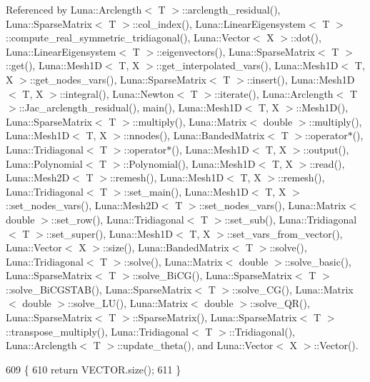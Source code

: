 Referenced by Luna\+::\+Arclength$<$ T $>$\+::arclength\+\_\+residual(), Luna\+::\+Sparse\+Matrix$<$ T $>$\+::col\+\_\+index(), Luna\+::\+Linear\+Eigensystem$<$ T $>$\+::compute\+\_\+real\+\_\+symmetric\+\_\+tridiagonal(), Luna\+::\+Vector$<$ X $>$\+::dot(), Luna\+::\+Linear\+Eigensystem$<$ T $>$\+::eigenvectors(), Luna\+::\+Sparse\+Matrix$<$ T $>$\+::get(), Luna\+::\+Mesh1\+D$<$ T, X $>$\+::get\+\_\+interpolated\+\_\+vars(), Luna\+::\+Mesh1\+D$<$ T, X $>$\+::get\+\_\+nodes\+\_\+vars(), Luna\+::\+Sparse\+Matrix$<$ T $>$\+::insert(), Luna\+::\+Mesh1\+D$<$ T, X $>$\+::integral(), Luna\+::\+Newton$<$ T $>$\+::iterate(), Luna\+::\+Arclength$<$ T $>$\+::\+Jac\+\_\+arclength\+\_\+residual(), main(), Luna\+::\+Mesh1\+D$<$ T, X $>$\+::\+Mesh1\+D(), Luna\+::\+Sparse\+Matrix$<$ T $>$\+::multiply(), Luna\+::\+Matrix$<$ double $>$\+::multiply(), Luna\+::\+Mesh1\+D$<$ T, X $>$\+::nnodes(), Luna\+::\+Banded\+Matrix$<$ T $>$\+::operator$\ast$(), Luna\+::\+Tridiagonal$<$ T $>$\+::operator$\ast$(), Luna\+::\+Mesh1\+D$<$ T, X $>$\+::output(), Luna\+::\+Polynomial$<$ T $>$\+::\+Polynomial(), Luna\+::\+Mesh1\+D$<$ T, X $>$\+::read(), Luna\+::\+Mesh2\+D$<$ T $>$\+::remesh(), Luna\+::\+Mesh1\+D$<$ T, X $>$\+::remesh(), Luna\+::\+Tridiagonal$<$ T $>$\+::set\+\_\+main(), Luna\+::\+Mesh1\+D$<$ T, X $>$\+::set\+\_\+nodes\+\_\+vars(), Luna\+::\+Mesh2\+D$<$ T $>$\+::set\+\_\+nodes\+\_\+vars(), Luna\+::\+Matrix$<$ double $>$\+::set\+\_\+row(), Luna\+::\+Tridiagonal$<$ T $>$\+::set\+\_\+sub(), Luna\+::\+Tridiagonal$<$ T $>$\+::set\+\_\+super(), Luna\+::\+Mesh1\+D$<$ T, X $>$\+::set\+\_\+vars\+\_\+from\+\_\+vector(), Luna\+::\+Vector$<$ X $>$\+::size(), Luna\+::\+Banded\+Matrix$<$ T $>$\+::solve(), Luna\+::\+Tridiagonal$<$ T $>$\+::solve(), Luna\+::\+Matrix$<$ double $>$\+::solve\+\_\+basic(), Luna\+::\+Sparse\+Matrix$<$ T $>$\+::solve\+\_\+\+Bi\+C\+G(), Luna\+::\+Sparse\+Matrix$<$ T $>$\+::solve\+\_\+\+Bi\+C\+G\+S\+T\+A\+B(), Luna\+::\+Sparse\+Matrix$<$ T $>$\+::solve\+\_\+\+C\+G(), Luna\+::\+Matrix$<$ double $>$\+::solve\+\_\+\+L\+U(), Luna\+::\+Matrix$<$ double $>$\+::solve\+\_\+\+Q\+R(), Luna\+::\+Sparse\+Matrix$<$ T $>$\+::\+Sparse\+Matrix(), Luna\+::\+Sparse\+Matrix$<$ T $>$\+::transpose\+\_\+multiply(), Luna\+::\+Tridiagonal$<$ T $>$\+::\+Tridiagonal(), Luna\+::\+Arclength$<$ T $>$\+::update\+\_\+theta(), and Luna\+::\+Vector$<$ X $>$\+::\+Vector().


\begin{DoxyCode}
609   \{
610     \textcolor{keywordflow}{return} VECTOR.size();
611   \}
\end{DoxyCode}
\mbox{\label{classLuna_1_1Vector_a60f8017f50e602151c84686ac081af66}} 
